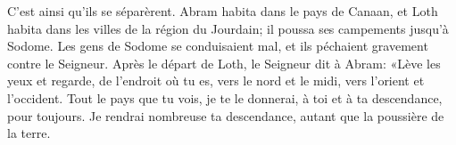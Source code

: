 C’est ainsi qu’ils se séparèrent.
Abram habita dans le pays de Canaan,
	et Loth habita dans les villes de la région du Jourdain;
	il poussa ses campements jusqu’à Sodome.
Les gens de Sodome se conduisaient mal,
	et ils péchaient gravement contre le Seigneur.
Après le départ de Loth, le Seigneur dit à Abram:
	«Lève les yeux et regarde, de l’endroit où tu es,
	vers le nord et le midi, vers l’orient et l’occident.
Tout le pays que tu vois, je te le donnerai,
	à toi et à ta descendance, pour toujours.
Je rendrai nombreuse ta descendance,
	autant que la poussière de la terre.
